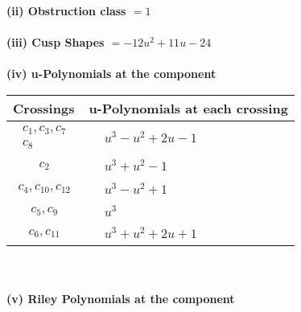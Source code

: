 \documentclass[1p]{elsarticle_modified}
\theoremstyle{definition}
\begin{document}
\flushleft \textbf{(ii) Obstruction class $= 1$}\\~\\
\flushleft \textbf{(iii) Cusp Shapes $= -12 u^2+11 u-24$}\\~\\
\newpage\renewcommand{\arraystretch}{1}
\flushleft \textbf{(iv) u-Polynomials at the component}\newline \\
\begin{tabular}{m{50pt}|m{274pt}}
Crossings & \hspace{64pt}u-Polynomials at each crossing \\
\hline $$\begin{aligned}c_{1},c_{3},c_{7}\\c_{8}\end{aligned}$$&$\begin{aligned}
&u^3- u^2+2 u-1
\end{aligned}$\\
\hline $$\begin{aligned}c_{2}\end{aligned}$$&$\begin{aligned}
&u^3+u^2-1
\end{aligned}$\\
\hline $$\begin{aligned}c_{4},c_{10},c_{12}\end{aligned}$$&$\begin{aligned}
&u^3- u^2+1
\end{aligned}$\\
\hline $$\begin{aligned}c_{5},c_{9}\end{aligned}$$&$\begin{aligned}
&u^3
\end{aligned}$\\
\hline $$\begin{aligned}c_{6},c_{11}\end{aligned}$$&$\begin{aligned}
&u^3+u^2+2 u+1
\end{aligned}$\\
\hline
\end{tabular}\\~\\
\newpage\renewcommand{\arraystretch}{1}
\flushleft \textbf{(v) Riley Polynomials at the component}\newline \\
\end{document}
